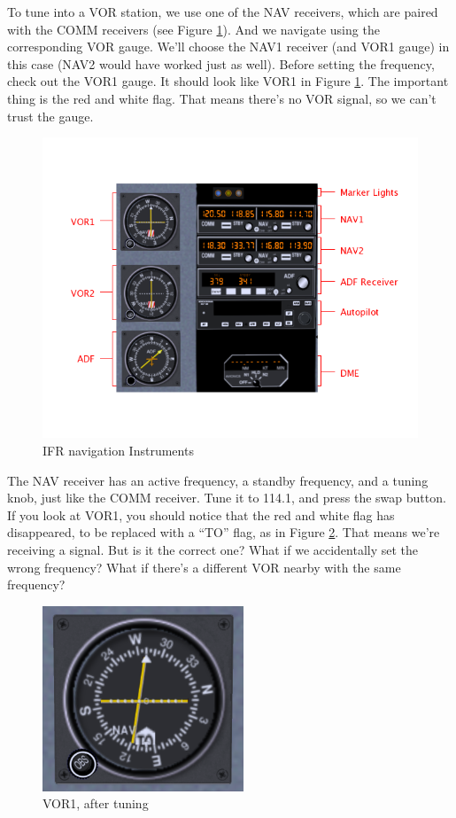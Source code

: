 
To tune into a VOR station, we use one of the NAV receivers, which are
paired with the COMM receivers (see Figure \ref{fig:panel}).  And we
navigate using the corresponding VOR gauge.  We'll choose the NAV1
receiver (and VOR1 gauge) in this case (NAV2 would have worked just as
well).  Before setting the frequency, check out the VOR1 gauge.  It
should look like VOR1 in Figure \ref{fig:panel}.  The important thing
is the red and white flag.  That means there's no VOR signal, so we
can't trust the gauge.

\begin{figure}
  \begin{center}
    \includegraphics[width=12cm]{img/panel_labelled}
    \caption{IFR navigation Instruments}
    \label{fig:panel}
  \end{center}
\end{figure}

The NAV receiver has an active frequency, a standby frequency, and a
tuning knob, just like the COMM receiver.  Tune it to 114.1, and press
the swap button.  If you look at VOR1, you should notice that the red
and white flag has disappeared, to be replaced with a ``TO'' flag, as
in Figure \ref{fig:VOR1}.  That means we're receiving a signal.  But
is it the correct one?  What if we accidentally set the wrong
frequency?  What if there's a different VOR nearby with the same
frequency?

\begin{figure}
  \begin{center}
    \includegraphics[width=6cm]{img/VOR1}
    \caption{VOR1, after tuning}
    \label{fig:VOR1}
  \end{center}
\end{figure}

